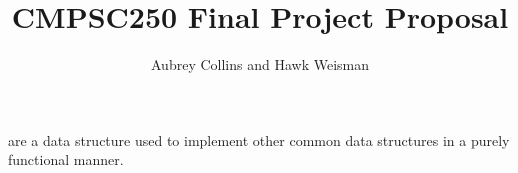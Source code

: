 \documentclass[a4paper]{tufte-handout}
\title{CMPSC250 Final Project Proposal}
\author{Aubrey Collins and Hawk Weisman}
\begin{document}
\maketitle

 are a data structure used to implement other common data structures in a purely functional manner.
\end{document}
